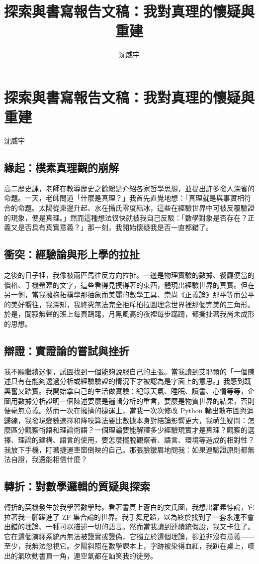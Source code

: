 \documentclass[a4paper,12pt]{article}
\title{探索與書寫報告文稿：我對真理的懷疑與重建}
\author{沈威宇}
\date{\temtoday}
\begin{document}
\temdoc
\section*{探索與書寫報告文稿：我對真理的懷疑與重建}
\hfill 沈威宇 \temtoday
\subsection{緣起：樸素真理觀的崩解}
高二歷史課，老師在教導歷史之餘總是介紹各家哲學思想，並提出許多發人深省的命題。一天，老師問道「什麼是真理？」我首先直覺地想：「真理就是與事實相符合的命題。太陽從東邊升起、水在攝氏零度結冰，這些在經驗世界中可被反覆驗證的現象，便是真理。」然而這種想法很快就被我自己反駁：「數學對象是否存在？正義又是否具有真實意義？」那一刻，我開始懷疑我是否一直都錯了。
\subsection{衝突：經驗論與形上學的拉扯}
之後的日子裡，我像被兩匹馬往反方向拉扯。一邊是物理實驗的數據、餐廳便當的價格、手機螢幕的文字，這些看得見摸得著的東西，體現出經驗世界的真實。但在另一側，當我擁抱拓樸學那抽象而美麗的數學工具、崇尚《正義論》那平等而公平的美好嚮往，我深知，我終究無法完全拒斥柏拉圖理念世界裡那個完美的三角形。於是，闃寂無聲的班上每頁躊躇，月黑風高的夜裡每步蹣跚，都撕扯著我尚未成形的思想。
\subsection{辯證：實證論的嘗試與挫折}
我不願繼續迷惘，試圖找到一個能夠說服自己的主張。當我讀到艾耶爾的「一個陳述只有在能夠透過分析或經驗驗證的情況下才被認為是字面上的意思。」我感到既興奮又踏實。我開始拿自己的生活做實驗：紀錄天氣、睡眠、讀書、心情等等，企圖用數據分析證明一個陳述要麼是邏輯分析的重言，要麼是物質世界的結果，否則便毫無意義。然而一次在擁擠的捷運上，當我一次次修改 Python 輸出散布圖與迴歸線，我發現變數選擇和降噪算法要比數據本身對結論影響更大，我萌生疑問：怎麼區分觀察術語和理論術語？一個理論要能解釋多少經驗現實才是真理？觀察的選擇、理論的建構、語言的使用，要怎麼擺脫觀察者、語言、環境等造成的相對性？我放下手機，盯著捷運車窗倒映的自己。那張臉皺眉地問我：如果連驗證原則都無法自證，我還能相信什麼？
\subsection{轉折：對數學邏輯的質疑與探索}
轉折的契機發生於我學習數學時。看著書頁上蒼白的文氏圖，我想出羅素悖論，它拉著我一腳躍進了 ZF 集合論的世界。我手舞足蹈，以為終於找到了一套永遠不會出錯的理論、一種可以描述一切的語言。然而當我讀到連續統假設，我又卡住了。它在這個演繹系統內無法被證實或證偽，它獨立於這個理論，卻並非沒有意義——至少，我無法忽視它。夕陽斜照在數學課本上，字跡被染得血紅，我趴在桌上，嘆出的氣吹動書頁一角，連空氣都在訕笑我的徒勞。
\end{document}
